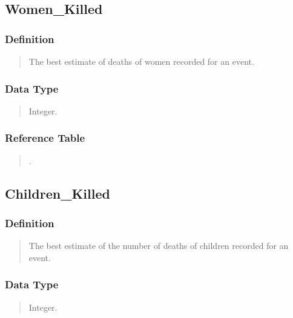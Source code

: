 \documentclass[letterpaper,10pt,english]{sphinxmanual}
\begin{document}
\subsection{Women\_Killed}
\label{\detokenize{database_schema:women-killed}}

\subsubsection{Definition}
\label{\detokenize{database_schema:id46}}\begin{quote}

\sphinxAtStartPar
The best estimate of deaths of women recorded for an event.
\end{quote}


\subsubsection{Data Type}
\label{\detokenize{database_schema:id47}}\begin{quote}

\sphinxAtStartPar
Integer.
\end{quote}


\subsubsection{Reference Table}
\label{\detokenize{database_schema:id48}}\begin{quote}

\sphinxAtStartPar
{\hyperref[\detokenize{database_schema:overview-table}]{}}.
\end{quote}


\subsection{Children\_Killed}
\label{\detokenize{database_schema:children-killed}}

\subsubsection{Definition}
\label{\detokenize{database_schema:id49}}\begin{quote}

\sphinxAtStartPar
The best estimate of the number of deaths of children recorded for an event.
\end{quote}


\subsubsection{Data Type}
\label{\detokenize{database_schema:id50}}\begin{quote}

\sphinxAtStartPar
Integer.
\end{quote}
\end{document}
